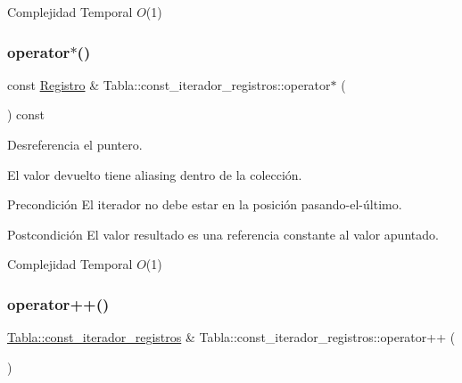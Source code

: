 \begin{DoxyDescription}
\item[Complejidad Temporal]$O$(1)
\end{DoxyDescription}\mbox{\label{classTabla_1_1const__iterador__registros_a821dca3f8ddeb2e3eb4142b1a73b31dd}} 
\subsubsection{\texorpdfstring{operator$\ast$()}{operator*()}}
{\footnotesize\ttfamily const \mbox{\hyperlink{classRegistro}{Registro}} \& Tabla\+::const\+\_\+iterador\+\_\+registros\+::operator$\ast$ (\begin{DoxyParamCaption}{ }\end{DoxyParamCaption}) const}



Desreferencia el puntero. 

El valor devuelto tiene aliasing dentro de la colección.

\begin{DoxyPrecond}{Precondición}
El iterador no debe estar en la posición pasando-\/el-\/último. 
\end{DoxyPrecond}
\begin{DoxyPostcond}{Postcondición}
El valor resultado es una referencia constante al valor apuntado.
\end{DoxyPostcond}

\begin{DoxyDescription}
\item[Complejidad Temporal]$O$(1)
\end{DoxyDescription}\mbox{\label{classTabla_1_1const__iterador__registros_a396373a330a7c56e3112df2bcccef885}} 
\subsubsection{\texorpdfstring{operator++()}{operator++()}}
{\footnotesize\ttfamily \mbox{\hyperlink{classTabla_1_1const__iterador__registros}{Tabla\+::const\+\_\+iterador\+\_\+registros}} \& Tabla\+::const\+\_\+iterador\+\_\+registros\+::operator++ (\begin{DoxyParamCaption}{ }\end{DoxyParamCaption})}




